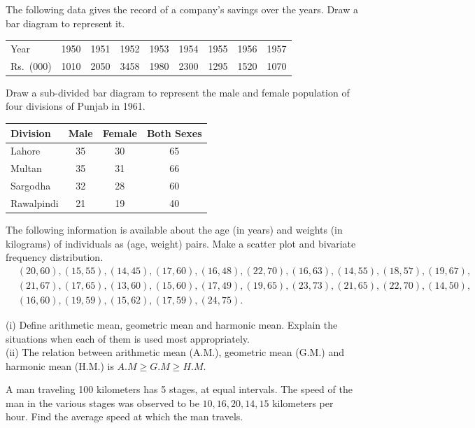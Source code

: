 \documentclass[11pt,a4paper]{article}
\begin{document}
\begin{longlist}
\item The following data gives the record of a company's savings over the years. Draw a bar diagram to represent it.
\begin{center}
\begin{tabular}{l|cccccccc}
Year & 1950 & 1951 & 1952 & 1953 & 1954 & 1955 & 1956 & 1957 \\
Rs.\ (000) & 1010 & 2050 & 3458 & 1980 & 2300 & 1295 & 1520 & 1070
\end{tabular}
\end{center}

\item Draw a sub-divided bar diagram to represent the male and female population of four divisions of Punjab in 1961.
\begin{center}
\begin{tabular}{lccc}
Division & Male & Female & Both Sexes \\
\hline
Lahore & 35 & 30 & 65 \\
Multan & 35 & 31 & 66 \\
Sargodha & 32 & 28 & 60 \\
Rawalpindi & 21 & 19 & 40
\end{tabular}
\end{center}

\item The following information is available about the age (in years) and weights (in kilograms) of individuals as (age, weight) pairs. Make a scatter plot and bivariate frequency distribution.
\[
\begin{aligned}
&(20,60),(15,55),(14,45),(17,60),(16,48),(22,70),(16,63),(14,55),(18,57),(19,67),\\
&(21,67),(17,65),(13,60),(15,60),(17,49),(19,65),(23,73),(21,65),(22,70),(14,50),\\
&(16,60),(19,59),(15,62),(17,59),(24,75).
\end{aligned}
\]

\item [19.] (i) Define arithmetic mean, geometric mean and harmonic mean. Explain the situations when each of them is used most appropriately.\\
(ii) The relation between arithmetic mean (A.M.), geometric mean (G.M.) and harmonic mean (H.M.) is $A.M \ge G.M \ge H.M$.

\item A man traveling 100 kilometers has 5 stages, at equal intervals. The speed of the man in the various stages was observed to be $10,16,20,14,15$ kilometers per hour. Find the average speed at which the man travels.


\end{longlist}
\end{document}

